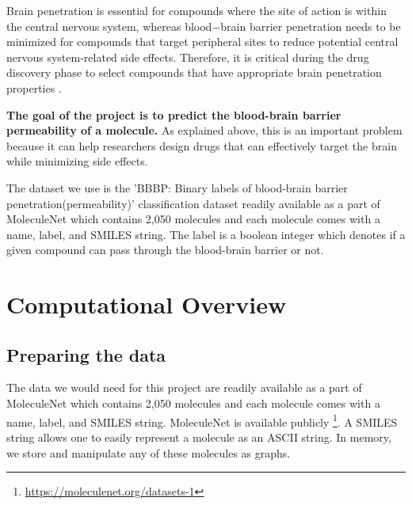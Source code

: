 \documentclass[fontsize=11pt]{article}
\begin{document}
Brain penetration is essential for compounds where the site of action is within the central nervous system, whereas blood$-$brain barrier penetration needs to be minimized for compounds that target peripheral sites to reduce potential central nervous system-related side effects. Therefore, it is critical during the drug discovery phase to select compounds that have appropriate brain penetration properties \citep{liu2004development}.

{\bf The goal of the project is to predict the blood-brain barrier permeability of a molecule.} As explained above, this is an important problem because it can help researchers design drugs that can effectively target the brain while minimizing side effects.

The dataset we use is the 'BBBP: Binary labels of blood-brain barrier penetration(permeability)' classification dataset readily available as a part of MoleculeNet \citep{wu2018moleculenet} which contains 2,050 molecules and each molecule comes with a name, label, and SMILES string. The label is a boolean integer which denotes if a given compound can pass through the blood-brain barrier or not.

\section*{Computational Overview}

\subsection*{Preparing the data}

The data we would need for this project are readily available as a part of MoleculeNet \citep{wu2018moleculenet} which contains 2,050 molecules and each molecule comes with a name, label, and SMILES string. MoleculeNet is available publicly \footnote{\url{https://moleculenet.org/datasets-1}}. A SMILES string allows one to easily represent a molecule as an ASCII string. In memory, we store and manipulate any of these molecules as graphs.
\end{document}
